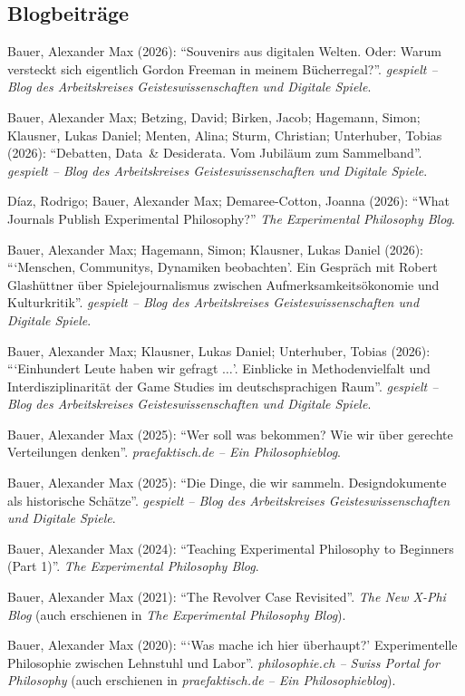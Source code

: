 \documentclass[a4paper,10pt]{article}
\newenvironment{literature}{%
   \parskip6pt\parindent0pt\raggedright
   \def\lititem{\hangindent=1cm\hangafter1}}{%
   \par\ignorespaces}
\begin{document}
\subsection*{Blogbeiträge}
\begin{literature}
\lititem Bauer, Alexander Max (2026): \enquote{Souvenirs aus digitalen Welten. Oder: Warum versteckt sich eigentlich Gordon Freeman in meinem Bücherregal?}. \textit{gespielt -- Blog des Arbeitskreises Geisteswissenschaften und Digitale Spiele}.

\lititem Bauer, Alexander Max; Betzing, David; Birken, Jacob; Hagemann, Simon; Klausner, Lukas Daniel; Menten, Alina; Sturm, Christian; Unterhuber, Tobias (2026): \enquote{Debatten, Data~\& Desiderata. Vom Jubiläum zum Sammelband}. \textit{gespielt -- Blog des Arbeitskreises Geisteswissenschaften und Digitale Spiele}.

\lititem Díaz, Rodrigo; Bauer, Alexander Max; Demaree-Cotton, Joanna (2026): \enquote{What Journals Publish Experimental Philosophy?} \textit{The Experimental Philosophy Blog}.

\lititem Bauer, Alexander Max; Hagemann, Simon; Klausner, Lukas Daniel (2026): \enquote{\enquote{Menschen, Communitys, Dynamiken beobachten}. Ein Gespräch mit Robert Glashüttner über Spielejournalismus zwischen Aufmerksamkeitsökonomie und Kulturkritik}. \textit{gespielt -- Blog des Arbeitskreises Geisteswissenschaften und Digitale Spiele}.

\lititem Bauer, Alexander Max; Klausner, Lukas Daniel; Unterhuber, Tobias (2026): \enquote{\enquote{Einhundert Leute haben wir gefragt $\ldots$}. Einblicke in Methodenvielfalt und Interdisziplinarität der Game Studies im deutschsprachigen Raum}. \textit{gespielt -- Blog des Arbeitskreises Geisteswissenschaften und Digitale Spiele}.

\lititem Bauer, Alexander Max (2025): \enquote{Wer soll was bekommen? Wie wir über gerechte Verteilungen denken}. \textit{praefaktisch.de -- Ein Philosophieblog}.

\lititem Bauer, Alexander Max (2025): \enquote{Die Dinge, die wir sammeln. Designdokumente als historische Schätze}. \textit{gespielt -- Blog des Arbeitskreises Geisteswissenschaften und Digitale Spiele}.

\lititem Bauer, Alexander Max (2024): \enquote{Teaching Experimental Philosophy to Beginners (Part 1)}. \textit{The Experimental Philosophy Blog}.

\lititem Bauer, Alexander Max (2021): \enquote{The Revolver Case Revisited}. \textit{The New X-Phi Blog} (auch erschienen in \textit{The Experimental Philosophy Blog}).

\lititem Bauer, Alexander Max (2020): \enquote{\enquote{Was mache ich hier überhaupt?} Experimentelle Philosophie zwischen Lehnstuhl und Labor}. \textit{philosophie.ch -- Swiss Portal for Philosophy} (auch erschienen in \textit{praefaktisch.de -- Ein Philosophieblog}).
\end{literature}
\end{document}
